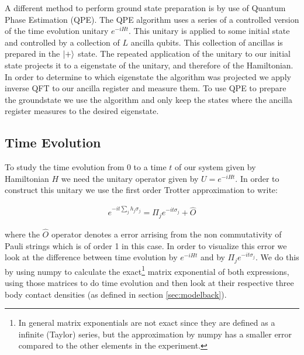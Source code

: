 \documentclass[10 pt, a4paper]{article}
\begin{document}
A different method to perform ground state preparation is by use of Quantum Phase Estimation (QPE). The QPE algorithm uses a series of a controlled version of the time evolution unitary $e^{- i H t}$. This unitary is applied to some initial state and controlled by a collection of $L$ ancilla qubits. This collection of ancillas is prepared in the $\ket{+}$ state. The repeated application of the unitary to our initial state projects it to a eigenstate of the unitary, and therefore of the Hamiltonian. In order to determine to which eigenstate the algorithm was projected we apply inverse QFT to our ancilla register and measure them. To use QPE to prepare the groundstate we use the algorithm and only keep the states where the ancilla register measures to the desired eigenstate.


\subsection{Time Evolution}

To study the time evolution from 0 to a time $t$ of our system given by Hamiltonian $H$ we need the unitary operator given by $U = e^{-iHt}$. In order to construct this unitary we use the first order Trotter approximation to write:

\begin{align*}
e^{-it \sum_j h_j \sigma_j } = \Pi_j e^{-it \sigma_j} + \hat{O}
\end{align*}

where the $\hat{O}$ operator denotes a error arrising from the non commutativity of Pauli strings which is of order 1 in this case. In order to visualize this error we look at the difference between time evolution by $e^{-i H t}$ and by $\Pi_j e^{-it \sigma_j}$. We do this by using numpy to calculate the exact\footnote{In general matrix exponentials are not exact since they are defined as a infinite (Taylor) series, but the approximation by numpy has a smaller error compared to the other elements in the experiment.} matrix exponential of both expressions, using those matrices to do time evolution and then look at their respective three body contact densities (as defined in section \ref{sec:modelback}). 
\end{document}
